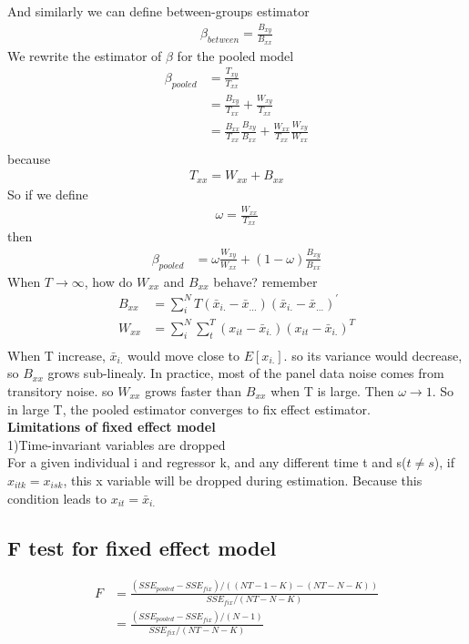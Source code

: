 \documentclass[a4paper]{article}
\begin{document}
And similarly we can define between-groups estimator
\begin{align*}
\beta_{between} = \frac{B_{xy}}{B_{xx}}
\end{align*}
We rewrite the  estimator of $\beta$ for the pooled model 
\begin{align*}
\beta_{pooled} & = \frac{T_{xy}}{T_{xx}} \\
                      & = \frac{B_{xy}}{T_{xx}} + \frac{W_{xy}}{T_{xx}}\\
                      & = \frac{B_{xx}}{T_{xx}}\frac{B_{xy}}{B_{xx}}  +  \frac{W_{xx}}{T_{xx}} \frac{W_{xy}}{W_{xx}} \\
\end{align*}
because
\begin{align*}
T_{xx} = W_{xx} + B_{xx}
\end{align*}
So if we define 
\begin{align*}
\omega = \frac{W_{xx}}{T_{xx}}
\end{align*}
then 
\begin{align*}
\beta_{pooled} & = \omega \frac{W_{xy}}{W_{xx}}+ (1 - \omega) \frac {B_{xy}}{B_{xx}} 
\end{align*}
When $T \rightarrow \infty$, how do $W_{xx}$ and $B_{xx}$ behave? remember
\begin{align*}
B_{xx} & = \sum_i^NT(\bar x_{i.}-\bar x_{...})(\bar x_{i.}-\bar x_{...})^{'} \\
W_{xx} &= \sum_i^N\sum_t^T(x_{it}-\bar x_{i.})(x_{it}- \bar x_{i.})^T\\
\end{align*} 
When T increase, $\bar x_{i.}$ would move close to $E[x_{i.}]$. so its variance would decrease, so $B_{xx}$ grows sub-linealy. In practice, most of the panel data noise comes from transitory noise. so $W_{xx}$ grows faster than $B_{xx}$ when T is large. Then $\omega \rightarrow 1$. So in large T, the pooled estimator converges to fix effect estimator.\\
{\bf Limitations of fixed effect model}\\
1)Time-invariant variables are dropped\\
For a given individual i and regressor k, and any different time t and s($t \neq s$), if $x_{itk}=x_{isk}$, this x variable will be dropped during estimation. Because this condition leads to $x_{it} = \bar x_{i.}$\\  
\subsection{F test for fixed effect model}
\begin{align*}
F & = \frac{(SSE_{pooled}-SSE_{fix})/((NT-1-K)-(NT-N-K))}{SSE_{fix}/(NT-N-K)} \\
&= \frac{(SSE_{pooled}-SSE_{fix})/(N-1)}{SSE_{fix}/(NT-N-K)}
\end{align*}
\end{document}
